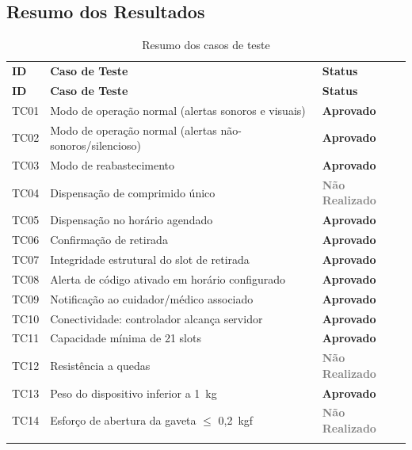 \documentclass[12pt,a4paper]{article}
\newcommand{\lightrule}{\arrayrulecolor{gray!35}\midrule\arrayrulecolor{black}}
\newcommand{\aprovado}{\textcolor{green!60!black}{\textbf{Aprovado}}}
\newcommand{\naorealizado}{\textcolor{gray}{\textbf{Não Realizado}}}
\begin{document}
\subsection{Resumo dos Resultados}

\begin{longtable}{>{\centering\arraybackslash}p{1.5cm} p{9.5cm} >{\centering\arraybackslash}p{3.5cm}}
    \toprule
    \textbf{ID} & \textbf{Caso de Teste} & \textbf{Status} \\
    \lightrule
    \endfirsthead
    \lightrule
    \textbf{ID} & \textbf{Caso de Teste} & \textbf{Status} \\
    \lightrule
    \endhead
    TC01 & Modo de operação normal (alertas sonoros e visuais)      & \aprovado \\
    \lightrule
    TC02 & Modo de operação normal (alertas não-sonoros/silencioso) & \aprovado \\
    \lightrule
    TC03 & Modo de reabastecimento                                  & \aprovado \\
    \lightrule
    TC04 & Dispensação de comprimido único                          & \naorealizado \\
    \lightrule
    TC05 & Dispensação no horário agendado                          & \aprovado \\
    \lightrule
    TC06 & Confirmação de retirada                                  & \aprovado \\
    \lightrule
    TC07 & Integridade estrutural do slot de retirada               & \aprovado \\
    \lightrule
    TC08 & Alerta de código ativado em horário configurado          & \aprovado \\
    \lightrule
    TC09 & Notificação ao cuidador/médico associado                 & \aprovado \\
    \lightrule
    TC10 & Conectividade: controlador alcança servidor              & \aprovado \\
    \lightrule
    TC11 & Capacidade mínima de 21 slots                            & \aprovado \\
    \lightrule
    TC12 & Resistência a quedas                                     & \naorealizado \\
    \lightrule
    TC13 & Peso do dispositivo inferior a 1~kg                      & \aprovado \\
    \lightrule
    TC14 & Esforço de abertura da gaveta $\leq$ 0,2~kgf            & \naorealizado \\
    \bottomrule
    \caption{Resumo dos casos de teste}
    \label{tab:tc_resumo}
\end{longtable}
\end{document}
